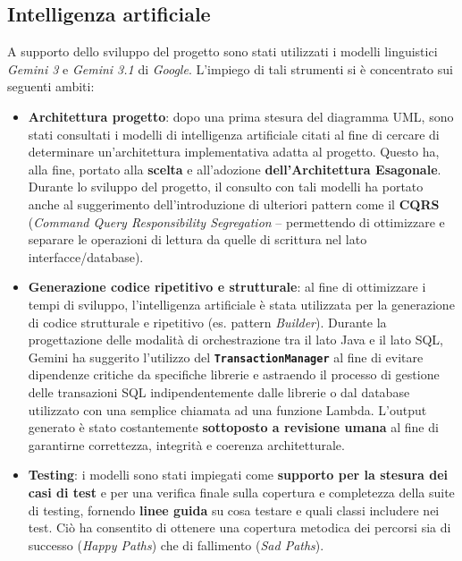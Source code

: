 \documentclass[a4paper,11pt]{article}
\begin{document}
\newpage
{}

\subsection{Intelligenza artificiale}
A supporto dello sviluppo del progetto sono stati utilizzati i modelli linguistici \textit{Gemini 3} e \textit{Gemini 3.1} di \textit{Google}. L'impiego di tali strumenti si è concentrato sui seguenti ambiti:
\begin{itemize}
	\item \textbf{Architettura progetto}: dopo una prima stesura del diagramma UML, sono stati consultati i modelli di intelligenza artificiale citati al fine di cercare di determinare un'architettura implementativa adatta al progetto. Questo ha, alla fine, portato alla \textbf{scelta} e all'adozione \textbf{dell'Architettura Esagonale}. Durante lo sviluppo del progetto, il consulto con tali modelli ha portato anche al suggerimento dell'introduzione di ulteriori pattern come il \textbf{CQRS} (\textit{Command Query Responsibility Segregation} -- permettendo di ottimizzare e separare le operazioni di lettura da quelle di scrittura nel lato interfacce/database).
 
	
	\item \textbf{Generazione codice ripetitivo e strutturale}: al fine di ottimizzare i tempi di sviluppo, l'intelligenza artificiale è stata utilizzata per la generazione di codice strutturale e ripetitivo (es. pattern \textit{Builder}). Durante la progettazione delle modalità di orchestrazione tra il lato Java e il lato SQL, Gemini ha suggerito l'utilizzo del \textbf{\texttt{TransactionManager}} al fine di evitare dipendenze critiche da specifiche librerie e astraendo il processo di gestione delle transazioni SQL indipendentemente dalle librerie o dal database utilizzato con una semplice chiamata ad una funzione Lambda. L'output generato è stato costantemente \textbf{sottoposto a revisione umana} al fine di garantirne correttezza, integrità e coerenza architetturale.
	
	\item \textbf{Testing}: i modelli sono stati impiegati come \textbf{supporto per la stesura dei casi di test} e per una verifica finale sulla copertura e completezza della suite di testing, fornendo \textbf{linee guida} su cosa testare e quali classi includere nei test. Ciò ha consentito di ottenere una copertura metodica dei percorsi sia di successo (\textit{Happy Paths}) che di fallimento (\textit{Sad Paths}).
	

\end{itemize}
\end{document}

